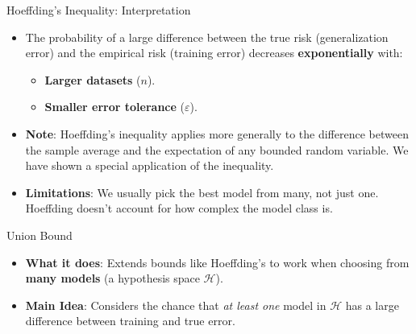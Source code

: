 \documentclass[
  ignorenonframetext,
]{beamer}
\providecommand{\tightlist}{%
  \setlength{\itemsep}{0pt}\setlength{\parskip}{0pt}}\usepackage{longtable,booktabs,array}
\begin{document}
\begin{frame}{Hoeffding's Inequality: Interpretation}
\label{hoeffdings-inequality-interpretation}
\begin{itemize}
\tightlist
\item
  The probability of a large difference between the true risk
  (generalization error) and the empirical risk (training error)
  decreases \textbf{exponentially} with:

  \begin{itemize}
  \tightlist
  \item
    \textbf{Larger datasets} (\(n\)).
  \item
    \textbf{Smaller error tolerance} (\(\varepsilon\)).
  \end{itemize}
\item
  \textbf{Note}: Hoeffding's inequality applies more generally to the
  difference between the sample average and the expectation of any
  bounded random variable. We have shown a special application of the
  inequality.
\item
  \textbf{Limitations}: We usually pick the best model from many, not
  just one. Hoeffding doesn't account for how complex the model class
  is.
\end{itemize}
\end{frame}

\begin{frame}{Union Bound}
\label{union-bound}
\begin{itemize}
\tightlist
\item
  \textbf{What it does}: Extends bounds like Hoeffding's to work when
  choosing from \textbf{many models} (a hypothesis space
  \(\mathcal{H}\)).
\item
  \textbf{Main Idea}: Considers the chance that \emph{at least one}
  model in \(\mathcal{H}\) has a large difference between training and
  true error.
\end{itemize}
\end{frame}
\end{document}
